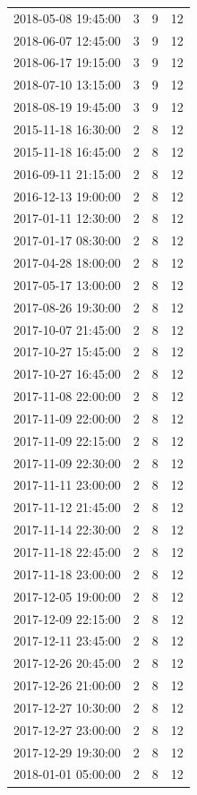 \begin{tabular}{lrrr}
2018-05-08 19:45:00 & 3 & 9 & 12 \\
2018-06-07 12:45:00 & 3 & 9 & 12 \\
2018-06-17 19:15:00 & 3 & 9 & 12 \\
2018-07-10 13:15:00 & 3 & 9 & 12 \\
2018-08-19 19:45:00 & 3 & 9 & 12 \\
2015-11-18 16:30:00 & 2 & 8 & 12 \\
2015-11-18 16:45:00 & 2 & 8 & 12 \\
2016-09-11 21:15:00 & 2 & 8 & 12 \\
2016-12-13 19:00:00 & 2 & 8 & 12 \\
2017-01-11 12:30:00 & 2 & 8 & 12 \\
2017-01-17 08:30:00 & 2 & 8 & 12 \\
2017-04-28 18:00:00 & 2 & 8 & 12 \\
2017-05-17 13:00:00 & 2 & 8 & 12 \\
2017-08-26 19:30:00 & 2 & 8 & 12 \\
2017-10-07 21:45:00 & 2 & 8 & 12 \\
2017-10-27 15:45:00 & 2 & 8 & 12 \\
2017-10-27 16:45:00 & 2 & 8 & 12 \\
2017-11-08 22:00:00 & 2 & 8 & 12 \\
2017-11-09 22:00:00 & 2 & 8 & 12 \\
2017-11-09 22:15:00 & 2 & 8 & 12 \\
2017-11-09 22:30:00 & 2 & 8 & 12 \\
2017-11-11 23:00:00 & 2 & 8 & 12 \\
2017-11-12 21:45:00 & 2 & 8 & 12 \\
2017-11-14 22:30:00 & 2 & 8 & 12 \\
2017-11-18 22:45:00 & 2 & 8 & 12 \\
2017-11-18 23:00:00 & 2 & 8 & 12 \\
2017-12-05 19:00:00 & 2 & 8 & 12 \\
2017-12-09 22:15:00 & 2 & 8 & 12 \\
2017-12-11 23:45:00 & 2 & 8 & 12 \\
2017-12-26 20:45:00 & 2 & 8 & 12 \\
2017-12-26 21:00:00 & 2 & 8 & 12 \\
2017-12-27 10:30:00 & 2 & 8 & 12 \\
2017-12-27 23:00:00 & 2 & 8 & 12 \\
2017-12-29 19:30:00 & 2 & 8 & 12 \\
2018-01-01 05:00:00 & 2 & 8 & 12 \\

\end{tabular}
